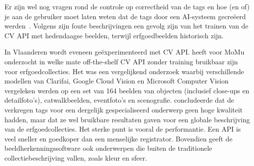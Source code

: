 Er zijn wel nog vragen rond de controle op correctheid van de tags en hoe (en of) je aan de gebruiker moet laten weten dat de tags door een AI-systeem gecre\"{e}erd werden~\autocite{Moriarty2018a}. Volgens \textcite{Hindle2017} zijn foute beschrijvingen een gevolg zijn van het trainen van de CV API met hedendaagse beelden, terwijl erfgoedbeelden historisch zijn.

In Vlaanderen wordt eveneen ge\"{e}xperimenteerd met CV API. \textcite{Vanstappen2019} heeft voor MoMu onderzocht in welke mate off-the-shelf CV API zonder training bruikbaar zijn voor erfgoedcollecties. Het was een vergelijkend onderzoek waarbij verschillende modellen van Clarifai, Google Cloud Vision en Microsoft Computer Vision vergeleken werden op een set van 164 beelden van objecten (inclusief close-ups en detailfoto’s), catwalkbeelden, eventfoto’s en scenografie. \textcite{Vanstappen2019} concludeerde dat de verkregen tags voor een dergelijk gespecialiseerd onderwerp geen hoge kwaliteit hadden, maar dat ze wel bruikbare resultaten gaven voor een globale beschrijving van de erfgoedcollecties. Het sterke punt is vooral de performantie. Een API is veel sneller en goedkoper dan een menselijke registrator. Bovendien geeft de beeldherkenningssoftware ook onderwerpen die buiten de traditionele collectiebeschrijving vallen, zoals kleur en sfeer.

